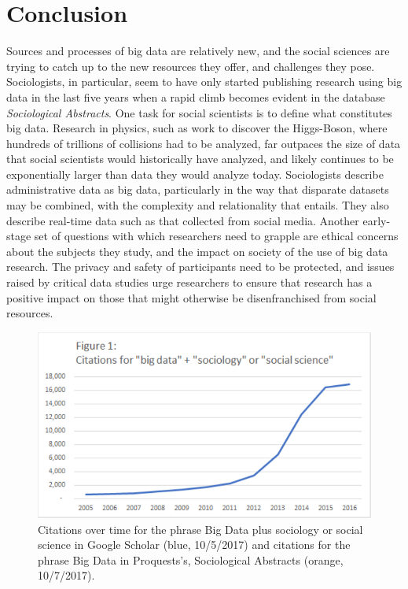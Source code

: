 \documentclass[sigconf]{acmart}
\begin{document}
\section{Conclusion}
Sources and processes of big data are relatively new, and the social sciences are trying to catch up to the new resources they offer, and challenges they pose.  Sociologists, in particular, seem to have only started publishing research using big data in the last five years when a rapid climb becomes evident in the database {\em Sociological Abstracts}.  One task for social scientists is to define what constitutes big data.  Research in physics, such as work to discover the Higgs-Boson, where hundreds of trillions of collisions had to be analyzed, far outpaces the size of data that social scientists would historically have analyzed, and likely continues to be exponentially larger than data they would analyze today.  Sociologists describe administrative data as big data, particularly in the way that disparate datasets may be combined, with the complexity and relationality that entails.  They also describe real-time data such as that collected from social media.  Another early-stage set of questions with which researchers need to grapple are ethical concerns about the subjects they study, and the impact on society of the use of big data research.  The privacy and safety of participants need to be protected, and issues raised by critical data studies urge researchers to ensure that research has a positive impact on those that might otherwise be disenfranchised from social resources.



\begin{figure}
\includegraphics[width=\columnwidth]{images/figure1}
\caption{Citations over time for the phrase Big Data plus sociology or social science in Google Scholar (blue, 10/5/2017) and citations for the phrase Big Data in Proquests's, Sociological Abstracts (orange, 10/7/2017).}
\label{f:figure1}
\end{figure}
\end{document}
